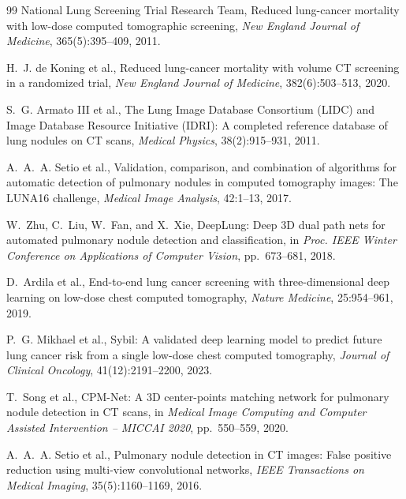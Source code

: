 \documentclass[preprint,12pt]{elsarticle}
\begin{document}
\begin{thebibliography}{99}
National Lung Screening Trial Research Team,
\newblock Reduced lung-cancer mortality with low-dose computed tomographic screening,
\newblock \emph{New England Journal of Medicine}, 365(5):395--409, 2011.

H.~J. de Koning et al.,
\newblock Reduced lung-cancer mortality with volume CT screening in a randomized trial,
\newblock \emph{New England Journal of Medicine}, 382(6):503--513, 2020.

S.~G. Armato III et al.,
\newblock The Lung Image Database Consortium (LIDC) and Image Database Resource Initiative (IDRI): A completed reference database of lung nodules on CT scans,
\newblock \emph{Medical Physics}, 38(2):915--931, 2011.

A.~A.~A. Setio et al.,
\newblock Validation, comparison, and combination of algorithms for automatic detection of pulmonary nodules in computed tomography images: The LUNA16 challenge,
\newblock \emph{Medical Image Analysis}, 42:1--13, 2017.

W.~Zhu, C.~Liu, W.~Fan, and X.~Xie,
\newblock DeepLung: Deep 3D dual path nets for automated pulmonary nodule detection and classification,
\newblock in \emph{Proc. IEEE Winter Conference on Applications of Computer Vision}, pp.~673--681, 2018.

D.~Ardila et al.,
\newblock End-to-end lung cancer screening with three-dimensional deep learning on low-dose chest computed tomography,
\newblock \emph{Nature Medicine}, 25:954--961, 2019.

P.~G. Mikhael et al.,
\newblock Sybil: A validated deep learning model to predict future lung cancer risk from a single low-dose chest computed tomography,
\newblock \emph{Journal of Clinical Oncology}, 41(12):2191--2200, 2023.

T.~Song et al.,
\newblock CPM-Net: A 3D center-points matching network for pulmonary nodule detection in CT scans,
\newblock in \emph{Medical Image Computing and Computer Assisted Intervention -- MICCAI 2020}, pp.~550--559, 2020.

A.~A.~A. Setio et al.,
\newblock Pulmonary nodule detection in CT images: False positive reduction using multi-view convolutional networks,
\newblock \emph{IEEE Transactions on Medical Imaging}, 35(5):1160--1169, 2016.


\end{thebibliography}
\end{document}
